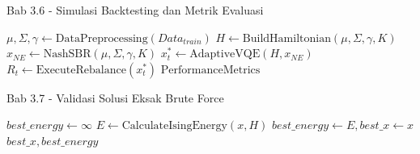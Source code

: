 \begin{frame}[fragile]{Bab 3.6 - Simulasi Backtesting dan Metrik Evaluasi}
    \begin{algorithm}[H]
        \scriptsize
        \begin{algorithmic}[1]
                    \State $\mu, \Sigma, \gamma \gets \text{DataPreprocessing}(Data_{train})$
                    \State $H \gets \text{BuildHamiltonian}(\mu, \Sigma, \gamma, K)$
                    \State $x_{NE} \gets \text{NashSBR}(\mu, \Sigma, \gamma, K)$
                    \State $x^*_t \gets \text{AdaptiveVQE}(H, x_{NE})$
                    \State $R_t \gets \text{ExecuteRebalance}(x^*_t)$
                \EndFor
                \State \Return $\text{PerformanceMetrics}$
            \EndProcedure
        \end{algorithmic}
    \end{algorithm}
\end{frame}

\begin{frame}[fragile]{Bab 3.7 - Validasi Solusi Eksak Brute Force}
    \begin{algorithm}[H]
        \footnotesize
        \begin{algorithmic}[1]
                \State $best\_energy \gets \infty$
                    \State $E \gets \text{CalculateIsingEnergy}(x, H)$
                        \State $best\_energy \gets E, best\_x \gets x$
                    \EndIf
                \EndFor
                \State \Return $best\_x, best\_energy$
            \EndProcedure
        \end{algorithmic}
    \end{algorithm}
\end{frame}
